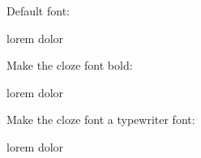 

Default font:

lorem  dolor

Make the cloze font bold:

\def\clozefont{\bf}

lorem  dolor

Make the cloze font a typewriter font:

\clozesetfont{\tt}

lorem  dolor

\bye

